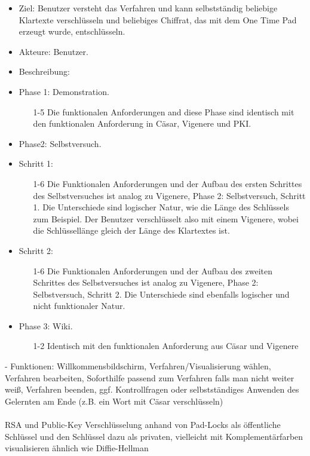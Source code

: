 \documentclass{article}
\begin{document}
\begin{itemize}[label={}]
\item Ziel: Benutzer versteht das Verfahren und kann selbstständig beliebige Klartexte verschlüsseln und beliebiges Chiffrat, das mit dem One Time Pad erzeugt wurde, entschlüsseln.
\item Akteure: Benutzer.
\item Beschreibung:
\item Phase 1: Demonstration.
\begin{enumerate}
 \item[1-5] Die funktionalen Anforderungen and diese Phase sind identisch mit den 
            funktionalen Anforderung in Cäsar, Vigenere und PKI.
\end{enumerate}

\item Phase2: Selbstversuch.
\item Schritt 1:
\begin{enumerate}
\item[1-6] Die Funktionalen Anforderungen und der Aufbau des ersten Schrittes des Selbstversuches ist analog zu Vigenere, Phase 2: Selbstversuch, Schritt 1. 
           Die Unterschiede sind logischer Natur, wie die Länge des Schlüssels zum Beispiel. 
           Der Benutzer verschlüsselt also mit einem Vigenere, wobei die Schlüssellänge gleich der Länge des Klartextes ist.
\end{enumerate}

\item Schritt 2:
\begin{enumerate}
\item[1-6] Die Funktionalen Anforderungen und der Aufbau des zweiten Schrittes des Selbstversuches ist analog zu Vigenere, Phase 2: Selbstversuch, Schritt 2. 
           Die Unterschiede sind ebenfalls logischer und nicht funktionaler Natur.
\end{enumerate}
\item Phase 3: Wiki.
\begin{enumerate}
 \item[1-2] Identisch mit den funktionalen Anforderung aus Cäsar und Vigenere
\end{enumerate}
\end{itemize}

- Funktionen: Willkommensbildschirm, Verfahren/Visualisierung wählen, Verfahren bearbeiten,
Soforthilfe passend zum Verfahren falls man nicht weiter weiß, Verfahren beenden,
ggf. Kontrollfragen oder selbstständiges Anwenden des Gelernten am Ende (z.B. ein Wort mit Cäsar verschlüsseln)
\\
\\
RSA und Public-Key Verschlüsselung anhand von Pad-Locks als
öffentliche Schlüssel und den Schlüssel  dazu als privaten,
vielleicht mit Komplementärfarben visualisieren ähnlich wie Diffie-Hellman
\end{document}
